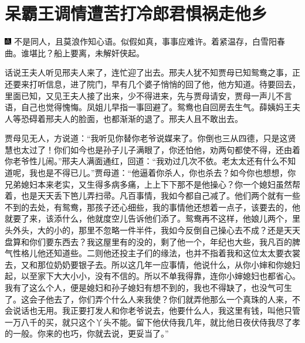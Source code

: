 

\chapter{呆霸王调情遭苦打\hspace{.5em}冷郎君惧祸走他乡}

{\includegraphics[width=3mm]{../Images/00005}  \kaishu 不是同人，且莫浪作知心语。似假如真，事事应难许。着紧温存，白雪阳春曲。谁堪比？船上要离，未解奸侠起。}

话说王夫人听见邢夫人来了，连忙迎了出去。邢夫人犹不知贾母已知鸳鸯之事，正还要来打听信息，进了院门，早有几个婆子悄悄的回了他，他方知道。待要回去，里面已知，又见王夫人接了出来，少不得进来，先与贾母请安，贾母一声儿不言语，自己也觉得愧悔。凤姐儿早指一事回避了。鸳鸯也自回房去生气。薛姨妈王夫人等恐碍着邢夫人的脸面，也都渐渐的退了。邢夫人且不敢出去。

贾母见无人，方说道：“我听见你替你老爷说媒来了。你倒也三从四德，只是这贤慧也太过了！你们如今也是孙子儿子满眼了，你还怕他，劝两句都使不得，还由着你老爷性儿闹。”邢夫人满面通红，回道：“我劝过几次不依。老太太还有什么不知道呢，我也是不得已儿。”贾母道：“他逼着你杀人，你也杀去？如今你也想想，你兄弟媳妇本来老实，又生得多病多痛，上上下下那不是他操心？你一个媳妇虽然帮着，也是天天丢下笆儿弄扫帚。凡百事情，我如今都自己减了。他们两个就有一些不到的去处，有鸳鸯，那孩子还心细些，我的事情他还想着一点子，该要去的，他就要了来，该添什么，他就度空儿告诉他们添了。鸳鸯再不这样，他娘儿两个，里头外头，大的小的，那里不忽略一件半件，我如今反倒自己操心去不成？还是天天盘算和你们要东西去？我这屋里有的没的，剩了他一个，年纪也大些，我凡百的脾气性格儿他还知道些。二则他还投主子们的缘法，也并不指着我和这位太太要衣裳去，又和那位奶奶要银子去。所以这几年一应事情，他说什么，从你小婶和你媳妇起，以至家下大大小小，没有不信的。所以不单我得靠，连你小婶媳妇也都省心。我有了这么个人，便是媳妇和孙子媳妇有想不到的，我也不得缺了，也没气可生了。这会子他去了，你们弄个什么人来我使？你们就弄他那么一个真珠的人来，不会说话也无用。我正要打发人和你老爷说去，他要什么人，我这里有钱，叫他只管一万八千的买，就只这个丫头不能。留下他伏侍我几年，就比他日夜伏侍我尽了孝的一般。你来的也巧，你就去说，更妥当了。”


